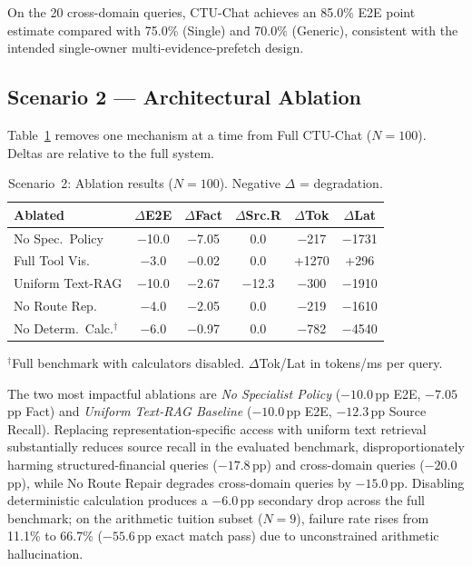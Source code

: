 On the 20 cross-domain queries, CTU-Chat achieves an 85.0\% E2E point estimate compared with 75.0\% (Single) and 70.0\% (Generic), consistent with the intended single-owner multi-evidence-prefetch design.

\subsection{Scenario 2 --- Architectural Ablation}
\label{sec:s2_results}

Table~\ref{tab:ablation} removes one mechanism at a time from Full CTU-Chat ($N{=}100$). Deltas are relative to the full system.

\begin{table}[!htbp]
\centering
\caption{Scenario~2: Ablation results ($N=100$). Negative $\Delta$ = degradation.}
\label{tab:ablation}
{\small\setlength{\tabcolsep}{3pt}
\begin{tabular}{lccccc}
\toprule
\textbf{Ablated} & \textbf{$\Delta$E2E} & \textbf{$\Delta$Fact} & \textbf{$\Delta$Src.R} & \textbf{$\Delta$Tok} & \textbf{$\Delta$Lat} \\
\midrule
No Spec.~Policy  & $-$10.0 & $-$7.05 & 0.0  & $-$217  & $-$1731 \\
Full Tool Vis.   & $-$3.0  & $-$0.02 & 0.0  & +1270   & +296 \\
Uniform Text-RAG & $-$10.0 & $-$2.67 & $-$12.3 & $-$300  & $-$1910 \\
No Route Rep.    & $-$4.0  & $-$2.05 & 0.0  & $-$219  & $-$1610 \\
No Determ.~Calc.$^\dagger$ & $-$6.0 & $-$0.97 & 0.0 & $-$782 & $-$4540 \\
\bottomrule
\end{tabular}}
\smallskip
{\footnotesize $^\dagger$Full benchmark with calculators disabled. $\Delta$Tok/Lat in tokens/ms per query.}
\end{table}

The two most impactful ablations are \emph{No Specialist Policy} ($-10.0$\,pp E2E, $-7.05$\,pp Fact) and \emph{Uniform Text-RAG Baseline} ($-10.0$\,pp E2E, $-12.3$\,pp Source Recall). Replacing representation-specific access with uniform text retrieval substantially reduces source recall in the evaluated benchmark, disproportionately harming structured-financial queries ($-17.8$\,pp) and cross-domain queries ($-20.0$\,pp), while No Route Repair degrades cross-domain queries by $-15.0$\,pp. Disabling deterministic calculation produces a $-6.0$\,pp secondary drop across the full benchmark; on the arithmetic tuition subset ($N{=}9$), failure rate rises from 11.1\% to 66.7\% ($-55.6$\,pp exact match pass) due to unconstrained arithmetic hallucination.

